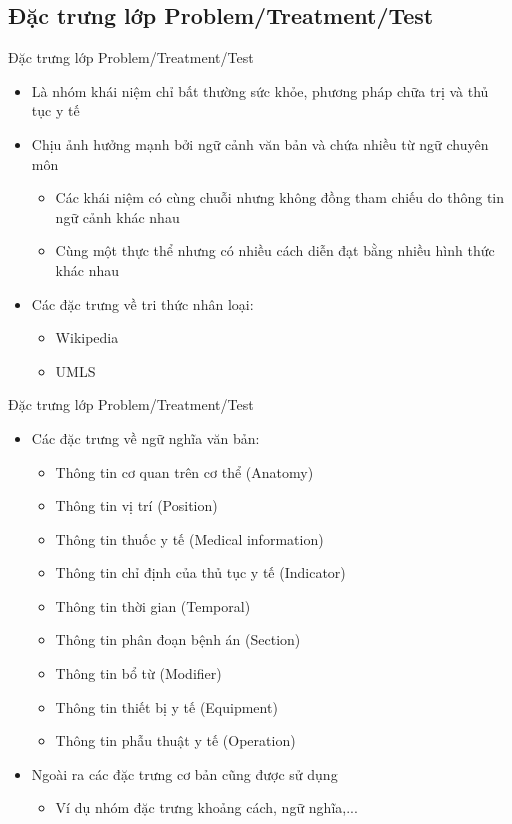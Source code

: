 \subsection{Đặc trưng lớp Problem/Treatment/Test}
\begin{frame}{Đặc trưng lớp Problem/Treatment/Test}
\putlogo
\begin{itemize}
	\item Là nhóm khái niệm chỉ bất thường sức khỏe, phương pháp chữa trị và thủ tục y tế
	\item Chịu ảnh hưởng mạnh bởi ngữ cảnh văn bản và chứa nhiều từ ngữ chuyên môn
	\begin{itemize}
		\item Các khái niệm có cùng chuỗi nhưng không đồng tham chiếu do thông tin ngữ cảnh khác nhau
		\item Cùng một thực thể nhưng có nhiều cách diễn đạt bằng nhiều hình thức khác nhau
	\end{itemize}
	\item Các đặc trưng về tri thức nhân loại:
	\begin{itemize}
		\item Wikipedia
		\item UMLS
	\end{itemize}
\end{itemize}
\end{frame}

\begin{frame}{Đặc trưng lớp Problem/Treatment/Test}
\begin{itemize}
	\item Các đặc trưng về ngữ nghĩa văn bản:
	\begin{itemize}
		\item Thông tin cơ quan trên cơ thể (Anatomy)
		\item Thông tin vị trí (Position)
		\item Thông tin thuốc y tế (Medical information)
		\item Thông tin chỉ định của thủ tục y tế (Indicator)
		\item Thông tin thời gian (Temporal)
		\item Thông tin phân đoạn bệnh án (Section)
		\item Thông tin bổ từ (Modifier)
		\item Thông tin thiết bị y tế (Equipment)
		\item Thông tin phẫu thuật y tế (Operation)
	\end{itemize}
	\item Ngoài ra các đặc trưng cơ bản cũng được sử dụng
	\begin{itemize}
		\item Ví dụ nhóm đặc trưng khoảng cách, ngữ nghĩa,...
	\end{itemize}
\end{itemize}
\end{frame}
